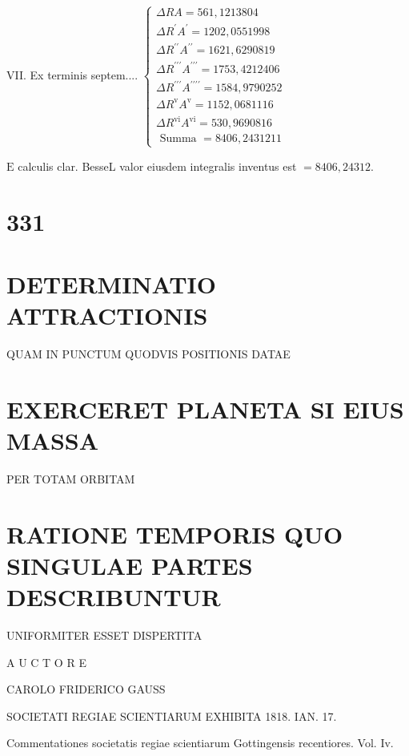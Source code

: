 \documentclass[twoside,12pt, showframe]{memoir}
\begin{document}
\begin{center}
\end{center}

VII. Ex terminis septem.... \(\left\{\begin{array}{l}\Delta R A=561,1213804 \\ \Delta R^{\prime} A^{\prime}=1202,0551998 \\ \Delta R^{\prime \prime} A^{\prime \prime}=1621,6290819 \\ \Delta R^{\prime \prime \prime} A^{\prime \prime \prime}=1753,4212406 \\ \Delta R^{\prime \prime \prime} A^{\prime \prime \prime \prime}=1584,9790252 \\ \Delta R^{\mathrm{v}} A^{\mathrm{v}}=1152,0681116 \\ \Delta R^{\mathrm{vi}} A^{\mathrm{vi}}=530,9690816 \\ \hline \text { Summa }=8406,2431211\end{array}\right.\)

\(\mathrm{E}\) calculis clar. BesseL valor eiusdem integralis inventus est \(=8406,24312\).

\section*{331}
\section*{DETERMINATIO ATTRACTIONIS}
QUAM IN PUNCTUM QUODVIS POSITIONIS DATAE

\section*{EXERCERET PLANETA SI EIUS MASSA}
PER TOTAM ORBITAM

\section*{RATIONE TEMPORIS QUO SINGULAE PARTES DESCRIBUNTUR}
UNIFORMITER ESSET DISPERTITA

A U C T O R E

CAROLO FRIDERICO GAUSS

SOCIETATI REGIAE SCIENTIARUM EXHIBITA 1818. IAN. 17.

Commentationes societatis regiae scientiarum Gottingensis recentiores. Vol. Iv.
\end{document}
